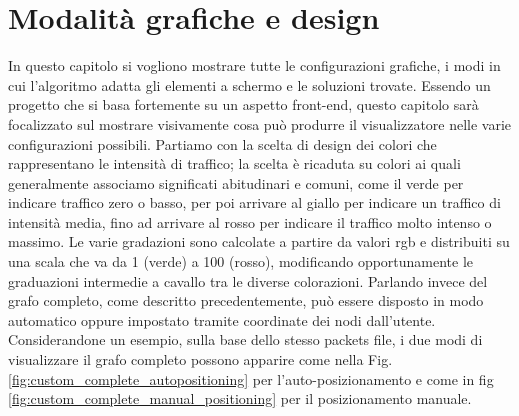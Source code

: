 \documentclass[binding=0.6cm]{sapthesis}
\begin{document}
\section{Modalità grafiche e design}
In questo capitolo si vogliono mostrare tutte le configurazioni grafiche, i modi in cui l'algoritmo adatta gli elementi a schermo e le soluzioni trovate.
Essendo un progetto che si basa fortemente su un aspetto front-end, questo capitolo sarà focalizzato sul mostrare visivamente cosa può produrre il visualizzatore nelle varie configurazioni possibili.
Partiamo con la scelta di design dei colori che rappresentano le intensità di traffico; la scelta è ricaduta su colori ai quali generalmente associamo significati abitudinari e comuni,
come il verde per indicare traffico zero o basso, per poi arrivare al giallo per indicare un traffico di intensità media, fino ad arrivare al rosso
per indicare il traffico molto intenso o massimo. Le varie gradazioni sono calcolate a partire da valori rgb e distribuiti su una scala che va da 1 (verde) a 100 (rosso), modificando opportunamente le graduazioni intermedie a cavallo tra le diverse colorazioni.
Parlando invece del grafo completo, come descritto precedentemente, può essere disposto in modo automatico oppure impostato tramite coordinate dei nodi dall'utente. 
Considerandone un esempio, sulla base dello stesso packets file, i due modi di visualizzare il grafo completo possono apparire come nella Fig. \ref{fig:custom_complete_autopositioning} per l'auto-posizionamento e come in fig \ref{fig:custom_complete_manual_positioning} per il posizionamento manuale.
\end{document}
